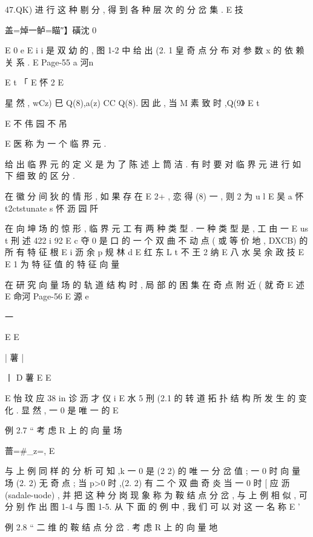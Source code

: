 47.QK) 进 行 这 种 剔 分 , 得 到 各 种 层 次 的 分 岔 集 .
E 技

盖=焯一鲈=瞄″】磺沈 0

E
0
e
E i i
是 双 幼 的 , 图 1-2 中 给 出 (2. 1 皇 奇 点 分 布 对 参 数 x 的 依 赖 关 系 .
E
Page-55
a 河n

E t 「
E 怀 2
E

星 然 , wCz) 巳 Q(8),a(z) CC Q(8). 因 此 , 当 M 素 致 时 ,Q(9》
E t

E 不 伟 园 不 吊

E 医
称 为 一 个 临 界 元 .

给 出 临 界 元 的 定 义 是 为 了 陈 述 上 筒 洁 . 有 时 要 对 临 界 元 进 行
如 下 细 致 的 区 分 .

在 徽 分 间 狄 的 情 形 , 如 果 存 在 E 2+ , 恋 得 (8) 一 , 则 2 为
u l
E 吴 a 怀
t2ctstunate s 怀 沥
园 阡

在 向 坤 场 的 惊 形 , 临 界 元 工 有 两 种 类 型 . 一 种 类 型 是 , 工 由 一
E us t 刑 述 422 i 92
E c
夺 0 是 口 的 一 个 双 曲 不 动 点 ( 或 等 价 地 , DXCB) 的 所 有 特 征 根
E i 沥 余 p 规 林 d
E 红 东 L t 不 王 2 纳
E 八 水 吴 余 政 技
E
E
1 为 特 征 值 的 特 征 向 量

在 研 究 向 量 场 的 轨 道 结 构 时 , 局 部 的 困 集 在 奇 点 附 近 ( 就 奇
E 述
E 命河
Page-56
E 源 e

一

E E

|
薯
|

丨 D
薯
E E

E 怡 玟 应 38 in 诊 沥 才 仪
i
E 水 5
刑 (2.1 的 转 道 拓 扑 结 构 所 发 生 的 变 化 . 显 然 , 一 0 是 唯 一 的
E

例 2.7 “ 考 虑 R 上 的 向 量 场

蔷=#_z=, E

与 上 例 同 样 的 分 析 可 知 ,k 一 0 是 (2 2) 的 唯 一 分 岔 值 ; 一 0 时 向
量 场 (2. 2) 无 奇 点 ; 当 p>0 时 ,(2. 2) 有 二 个 双 曲 奇 炎 当 一 0 时
[ 应 沥
(sadale-uode) , 并 把 这 种 分 岗 现 象 称 为 鞍 结 点 分 岔 , 与 上 例 相 似 ,
可 分 别 作 出 图 1-4 与 图 1-5. 从 下 面 的 例 中 , 我 们 可 以 对 这 一 名 称
E '

例 2.8 “ 二 维 的 鞍 结 点 分 岔 . 考 虑 R 上 的 向 量 地

